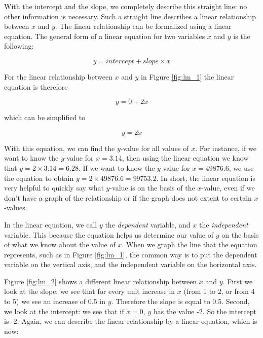 \documentclass[]{book}\usepackage[]{graphicx}\usepackage[]{color}
\begin{document}
With the intercept and the slope, we completely describe this straight line: no other information is necessary. Such a straight line describes a linear relationship between $x$ and $y$. The linear relationship can be formalized using a linear equation. The general form of a linear equation for two variables $x$ and $y$ is the following:

\begin{equation}
y = intercept + slope \times x
\end{equation}


For the linear relationship between $x$ and $y$ in Figure \ref{fig:lm_1} the linear equation is therefore

\begin{equation}
y = 0 + 2 x
\end{equation}

which can be simplified to

\begin{equation}
y =  2 x
\end{equation}


With this equation, we can find the $y$-value for all values of $x$. For instance, if we want to know the $y$-value for $x=3.14$, then using the linear equation we know that $y = 2 \times 3.14 = 6.28$. If we want to know the $y$ value for $x=49876.6$, we use the equation to obtain $y=2\times 49876.6 = 99753.2$. In short, the linear equation is very helpful to quickly say what $y$-value is on the basis of the $x$-value, even if we don't have a graph of the relationship or if the graph does not extent to certain $x$-values.


In the linear equation, we call $y$ the \textit{dependent} variable, and $x$ the \textit{independent} variable. This because the equation helps us determine our value of $y$ on the basis of what we know about the value of $x$. When we graph the line that the equation represents, such as in Figure \ref{fig:lm_1}, the common way is to put the dependent variable on the vertical axis, and the independent variable on the horizontal axis. 


Figure \ref{fig:lm_2} shows a different linear relationship between $x$ and $y$. First we look at the slope: we see that for every unit increase in $x$ (from 1 to 2, or from 4 to 5) we see an increase of 0.5 in $y$. Therefore the slope is equal to 0.5. Second, we look at the intercept: we see that if $x=0$, $y$ has the value -2. So the intercept is -2. Again, we can describe the linear relationship by a linear equation, which is now:
\end{document}
